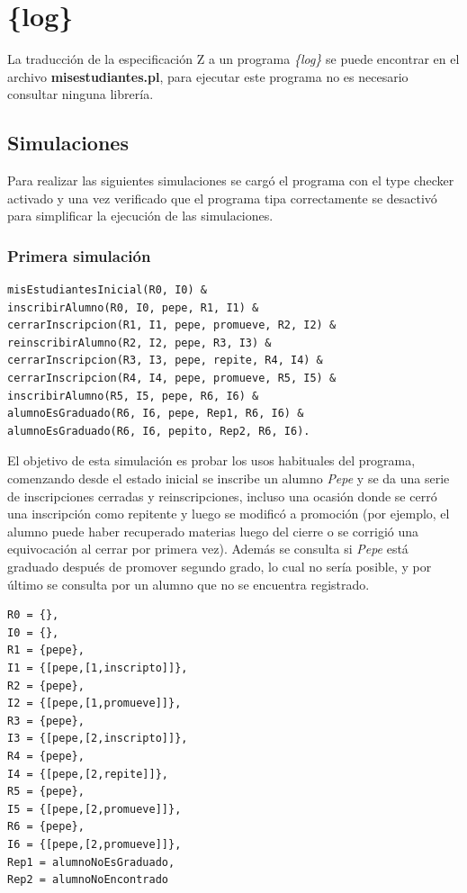 \documentclass{article}
\begin{document}
\section{\{log\}}
La traducción de la especificación Z a un programa \emph{\{log\}} se puede encontrar en el archivo \textbf{misestudiantes.pl}, para ejecutar este programa no es necesario consultar ninguna librería.

\subsection{Simulaciones}
Para realizar las siguientes simulaciones se cargó el programa con el type checker activado y una vez verificado que el programa tipa correctamente se desactivó para simplificar la ejecución de las simulaciones.

\subsubsection*{Primera simulación}
\begin{verbatim}
misEstudiantesInicial(R0, I0) & 
inscribirAlumno(R0, I0, pepe, R1, I1) & 
cerrarInscripcion(R1, I1, pepe, promueve, R2, I2) & 
reinscribirAlumno(R2, I2, pepe, R3, I3) & 
cerrarInscripcion(R3, I3, pepe, repite, R4, I4) & 
cerrarInscripcion(R4, I4, pepe, promueve, R5, I5) & 
inscribirAlumno(R5, I5, pepe, R6, I6) & 
alumnoEsGraduado(R6, I6, pepe, Rep1, R6, I6) & 
alumnoEsGraduado(R6, I6, pepito, Rep2, R6, I6).
\end{verbatim}

El objetivo de esta simulación es probar los usos habituales del programa, comenzando desde el estado inicial se inscribe un alumno \emph{Pepe} y se da una serie de inscripciones cerradas y reinscripciones, incluso una ocasión donde se cerró una inscripción como repitente y luego se modificó a promoción (por ejemplo, el alumno puede haber recuperado materias luego del cierre o se corrigió una equivocación al cerrar por primera vez). Además se consulta si \emph{Pepe} está graduado después de promover segundo grado, lo cual no sería posible, y por último se consulta por un alumno que no se encuentra registrado.

\begin{verbatim}
R0 = {},  
I0 = {},  
R1 = {pepe},  
I1 = {[pepe,[1,inscripto]]},  
R2 = {pepe},  
I2 = {[pepe,[1,promueve]]},  
R3 = {pepe},  
I3 = {[pepe,[2,inscripto]]},  
R4 = {pepe},  
I4 = {[pepe,[2,repite]]},  
R5 = {pepe},  
I5 = {[pepe,[2,promueve]]},  
R6 = {pepe},  
I6 = {[pepe,[2,promueve]]},  
Rep1 = alumnoNoEsGraduado,  
Rep2 = alumnoNoEncontrado
\end{verbatim}
\end{document}
